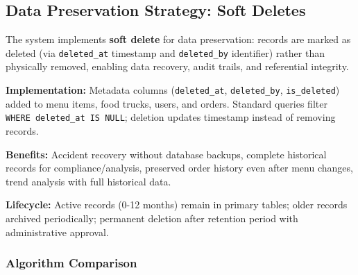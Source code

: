 \documentclass[12pt,a4paper]{article}
\begin{document}
\newpage

\subsection{Data Preservation Strategy: Soft Deletes}

\begin{tcolorbox}[colback=primaryblue!5, colframe=primaryblue, boxrule=1pt, arc=3pt, left=10pt, right=10pt, top=8pt, bottom=8pt]

The system implements \textbf{soft delete} for data preservation: records are marked as deleted (via \texttt{deleted\_at} timestamp and \texttt{deleted\_by} identifier) rather than physically removed, enabling data recovery, audit trails, and referential integrity.

\vspace{0.5em}

\textbf{Implementation:} Metadata columns (\texttt{deleted\_at}, \texttt{deleted\_by}, \texttt{is\_deleted}) added to menu items, food trucks, users, and orders. Standard queries filter \texttt{WHERE deleted\_at IS NULL}; deletion updates timestamp instead of removing records.

\vspace{0.5em}

\textbf{Benefits:} Accident recovery without database backups, complete historical records for compliance/analysis, preserved order history even after menu changes, trend analysis with full historical data.

\vspace{0.5em}

\textbf{Lifecycle:} Active records (0-12 months) remain in primary tables; older records archived periodically; permanent deletion after retention period with administrative approval.

\end{tcolorbox}

\newpage

\subsubsection{Algorithm Comparison}
\end{document}
